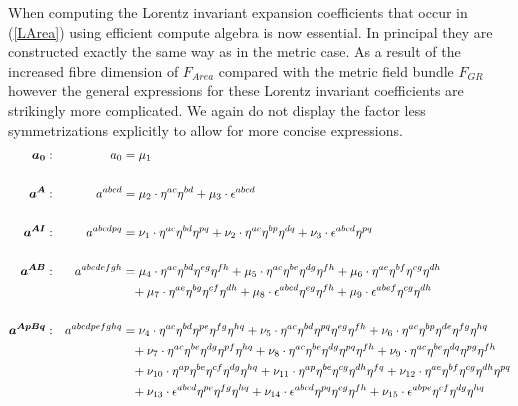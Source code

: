 \documentclass[a4paper,12pt, DIV=14, BCOR=5mm, twoside, headsepline]{scrbook}
\begin{document}
When computing the Lorentz invariant expansion coefficients that occur in (\ref{LArea}) using efficient compute algebra is now essential. In principal they are constructed exactly the same way as in the metric case. As a result of the increased fibre dimension of $F_{Area}$ compared with the metric field bundle $F_{GR}$ however the general expressions for these Lorentz invariant coefficients are strikingly more complicated. We again do not display the factor less symmetrizations explicitly to allow for more concise expressions.
\begin{align}\label{LorentzArea1}
\begin{alignedat}{2}
\boldsymbol{a_0}&: \ \ \ & a_0  &= \mu_1 \\
\\
\boldsymbol{a^{A}}&: \ \ \ & a^{abcd}  &= \mu_2 \cdot \eta^{ac} \eta^{bd} + \mu_{3} \cdot \epsilon^{abcd} \\
\\
\boldsymbol{a^{AI}}&: \ \ \ & a^{abcdpq}  &=  \nu_{1}\cdot\eta^{ac}\eta^{bd}\eta^{pq}+\nu_{2}\cdot\eta^{ac}\eta^{bp}\eta^{dq} + \nu_{3}\cdot\epsilon^{abcd}\eta^{pq}\\
\\
\boldsymbol{a^{AB}}&: \ \ \ & a^{abcdefgh}  &= \mu_{4}\cdot\eta^{ac}\eta^{bd}\eta^{eg}\eta^{fh}+\mu_{5}\cdot\eta^{ac}\eta^{be}\eta^{dg}\eta^{fh}+\mu_{6}\cdot\eta^{ae}\eta^{bf}\eta^{cg}\eta^{dh} \\
& & &\hphantom{=} +\mu_{7}\cdot\eta^{ae}\eta^{bg}\eta^{cf}\eta^{dh} + \mu_{8}\cdot\epsilon^{abcd}\eta^{eg}\eta^{fh}+\mu_{9}\cdot\epsilon^{abef}\eta^{cg}\eta^{dh}\\
\\
\boldsymbol{a^{ApBq}}&: \ \ \ & a^{abcdpefghq}  &=
\nu_{4}\cdot\eta^{ac}\eta^{bd}\eta^{pe}\eta^{fg}\eta^{hq}+\nu_{5}\cdot\eta^{ac}\eta^{bd}\eta^{pq}\eta^{eg}\eta^{fh}+\nu_{6}\cdot\eta^{ac}\eta^{bp}\eta^{de}\eta^{fg}\eta^{hq}\\
& & &\hphantom{=}+\nu_{7}\cdot\eta^{ac}\eta^{be}\eta^{dg}\eta^{pf}\eta^{hq}+\nu_{8}\cdot\eta^{ac}\eta^{be}\eta^{dg}\eta^{pq}\eta^{fh}+\nu_{9}\cdot\eta^{ac}\eta^{be}\eta^{dq}\eta^{pg}\eta^{fh}\\
& & &\hphantom{=}+\nu_{10}\cdot\eta^{ap}\eta^{be}\eta^{cf}\eta^{dg}\eta^{hq}+\nu_{11}\cdot\eta^{ap}\eta^{be}\eta^{cg}\eta^{dh}\eta^{fq}+\nu_{12}\cdot\eta^{ae}\eta^{bf}\eta^{cg}\eta^{dh}\eta^{pq}\\
& & &\hphantom{=} +\nu_{13}\cdot\epsilon^{abcd}\eta^{pe}\eta^{fg}\eta^{hq}+\nu_{14}\cdot\epsilon^{abcd}\eta^{pq}\eta^{eg}\eta^{fh}+\nu_{15}\cdot\epsilon^{abpe}\eta^{cf}\eta^{dg}\eta^{hq}\\

\end{alignedat}
\end{align}
\end{document}
